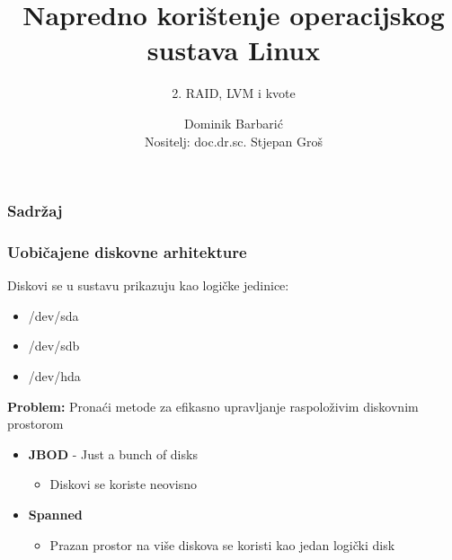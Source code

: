 \documentclass[t]{beamer}
\date{\todayiso}
\title[NKOSL]{Napredno korištenje operacijskog sustava Linux}
\author[Dominik Barbarić]{Dominik Barbarić\\{\small Nositelj: doc.dr.sc. Stjepan Groš}}
\subtitle{2. RAID, LVM i kvote}
\institute[FER]{Sveučilište u Zagrebu\\Fakultet elektrotehnike i računarstva}
\begin{document}
{
	\begin{frame}
		\maketitle
	\end{frame}
}

\begin{frame}
	\frametitle{Sadržaj}
	\tableofcontents
\end{frame}

\begin{frame}
	\frametitle{Uobičajene diskovne arhitekture}
	Diskovi se u sustavu prikazuju kao logičke jedinice:
	{\ttfamily
		\begin{itemize}
			\item[] /dev/sda
			\item[] /dev/sdb
			\item[] /dev/hda
		\end{itemize}
	}
	\textbf{Problem:} Pronaći metode za efikasno upravljanje raspoloživim diskovnim prostorom
	\vfill
	\begin{itemize}
		\item \textbf{JBOD} - Just a bunch of disks
		\begin{itemize}
			\item Diskovi se koriste neovisno
		\end{itemize}
		\item \textbf{Spanned}
		\begin{itemize}
			\item Prazan prostor na više diskova se koristi kao jedan logički disk
		\end{itemize}
	\end{itemize}
\end{frame}
\end{document}
